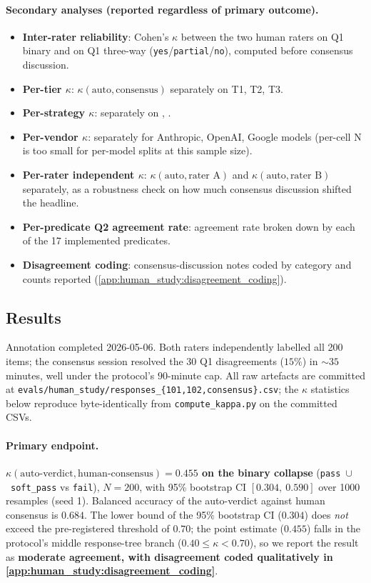 \paragraph{Secondary analyses (reported regardless of primary outcome).}
\begin{itemize}
\item \textbf{Inter-rater reliability}: Cohen's $\kappa$ between the two human raters on Q1 binary and on Q1 three-way (\texttt{yes}/\texttt{partial}/\texttt{no}), computed before consensus discussion.
\item \textbf{Per-tier $\kappa$}: $\kappa(\text{auto},\text{consensus})$ separately on T1, T2, T3.
\item \textbf{Per-strategy $\kappa$}: separately on \rawcode, \structured.
\item \textbf{Per-vendor $\kappa$}: separately for Anthropic, OpenAI, Google models (per-cell N is too small for per-model splits at this sample size).
\item \textbf{Per-rater independent $\kappa$}: $\kappa(\text{auto},\text{rater~A})$ and $\kappa(\text{auto},\text{rater~B})$ separately, as a robustness check on how much consensus discussion shifted the headline.
\item \textbf{Per-predicate Q2 agreement rate}: agreement rate broken down by each of the 17 implemented predicates.
\item \textbf{Disagreement coding}: consensus-discussion notes coded by category and counts reported (\cref{app:human_study:disagreement_coding}).
\end{itemize}

\subsection{Results}
\label{app:human_study:results}

Annotation completed 2026-05-06.
Both raters independently labelled all 200 items; the consensus session resolved the 30 Q1 disagreements ($15\%$) in $\sim 35$ minutes, well under the protocol's $90$-minute cap.
All raw artefacts are committed at \texttt{evals/human\_study/responses\_\{101,102,consensus\}.csv}; the $\kappa$ statistics below reproduce byte-identically from \texttt{compute\_kappa.py} on the committed CSVs.

\paragraph{Primary endpoint.}
\textbf{$\kappa(\text{auto-verdict}, \text{human-consensus}) = 0.455$ on the binary collapse} (\texttt{pass}~$\cup$~\texttt{soft\_pass} vs \texttt{fail}), $N=200$, with 95\% bootstrap CI $[0.304,\ 0.590]$ over 1000 resamples (seed 1).
Balanced accuracy of the auto-verdict against human consensus is $0.684$.
The lower bound of the 95\% bootstrap CI ($0.304$) does \emph{not} exceed the pre-registered threshold of $0.70$; the point estimate ($0.455$) falls in the protocol's middle response-tree branch ($0.40 \leq \kappa < 0.70$), so we report the result as \textbf{moderate agreement, with disagreement coded qualitatively in \cref{app:human_study:disagreement_coding}}.

